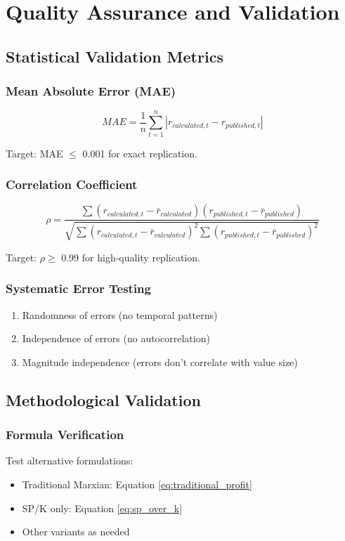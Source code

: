 \documentclass[12pt,a4paper]{article}
\begin{document}
\section{Quality Assurance and Validation}

\subsection{Statistical Validation Metrics}

\subsubsection{Mean Absolute Error (MAE)}
\begin{equation}
MAE = \frac{1}{n} \sum_{t=1}^n |r_{calculated,t} - r_{published,t}|
\label{eq:mae}
\end{equation}

Target: MAE $\leq$ 0.001 for exact replication.

\subsubsection{Correlation Coefficient}
\begin{equation}
\rho = \frac{\sum (r_{calculated,t} - \bar{r}_{calculated})(r_{published,t} - \bar{r}_{published})}{\sqrt{\sum (r_{calculated,t} - \bar{r}_{calculated})^2 \sum (r_{published,t} - \bar{r}_{published})^2}}
\label{eq:correlation}
\end{equation}

Target: $\rho \geq$ 0.99 for high-quality replication.

\subsubsection{Systematic Error Testing}
\begin{enumerate}
    \item Randomness of errors (no temporal patterns)
    \item Independence of errors (no autocorrelation)
    \item Magnitude independence (errors don't correlate with value size)
\end{enumerate}

\subsection{Methodological Validation}

\subsubsection{Formula Verification}
Test alternative formulations:
\begin{itemize}
    \item Traditional Marxian: Equation \ref{eq:traditional_profit}
    \item SP/K only: Equation \ref{eq:sp_over_k}
    \item Other variants as needed
\end{itemize}
\end{document}
